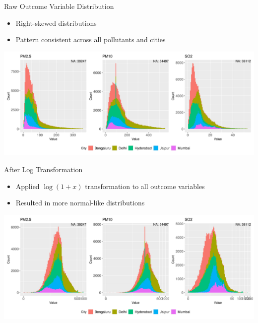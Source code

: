 \documentclass[svgnames, 12pt]{beamer}
\begin{document}
\begin{frame}{Raw Outcome Variable Distribution}
    \begin{itemize}
        \item Right-skewed distributions
        \item Pattern consistent across all pollutants and cities
    \end{itemize}
    \vspace{1em}
    \begin{center}
        \includegraphics[width=\textwidth]{assets/skewness.png}
    \end{center}
    \vfill
\end{frame}

\begin{frame}{After Log Transformation}
    \begin{itemize}
        \item Applied $\log(1 + x)$ transformation to all outcome variables
        \item Resulted in more normal-like distributions
    \end{itemize}
    \vspace{1em}
    \begin{center}
        \includegraphics[width=\textwidth]{assets/log-scaled-pollutants.png}
    \end{center}
    \vfill
\end{frame}
\end{document}
